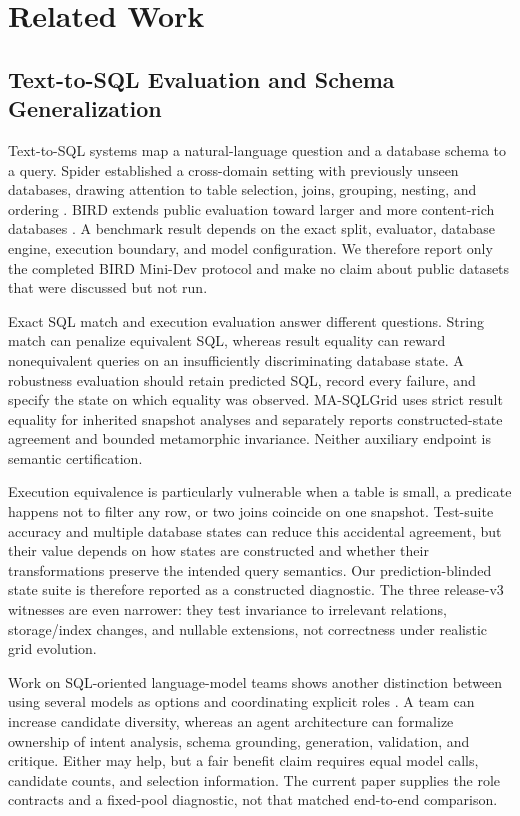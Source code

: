 \documentclass[applsci,article,submit,moreauthors]{Definitions/mdpi}
\newcommand{\masql}{MA-SQLGrid}
\begin{document}
\section{Related Work}

\subsection{Text-to-SQL Evaluation and Schema Generalization}

Text-to-SQL systems map a natural-language question and a database schema to a query. Spider established a cross-domain setting with previously unseen databases, drawing attention to table selection, joins, grouping, nesting, and ordering \cite{yu2018spider}. BIRD extends public evaluation toward larger and more content-rich databases \cite{li2023bird}. A benchmark result depends on the exact split, evaluator, database engine, execution boundary, and model configuration. We therefore report only the completed BIRD Mini-Dev protocol and make no claim about public datasets that were discussed but not run.

Exact SQL match and execution evaluation answer different questions. String match can penalize equivalent SQL, whereas result equality can reward nonequivalent queries on an insufficiently discriminating database state. A robustness evaluation should retain predicted SQL, record every failure, and specify the state on which equality was observed. \masql{} uses strict result equality for inherited snapshot analyses and separately reports constructed-state agreement and bounded metamorphic invariance. Neither auxiliary endpoint is semantic certification.

Execution equivalence is particularly vulnerable when a table is small, a predicate happens not to filter any row, or two joins coincide on one snapshot. Test-suite accuracy and multiple database states can reduce this accidental agreement, but their value depends on how states are constructed and whether their transformations preserve the intended query semantics. Our prediction-blinded state suite is therefore reported as a constructed diagnostic. The three release-v3 witnesses are even narrower: they test invariance to irrelevant relations, storage/index changes, and nullable extensions, not correctness under realistic grid evolution.

Work on SQL-oriented language-model teams shows another distinction between using several models as options and coordinating explicit roles \cite{lee2025team}. A team can increase candidate diversity, whereas an agent architecture can formalize ownership of intent analysis, schema grounding, generation, validation, and critique. Either may help, but a fair benefit claim requires equal model calls, candidate counts, and selection information. The current paper supplies the role contracts and a fixed-pool diagnostic, not that matched end-to-end comparison.
\end{document}
